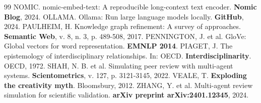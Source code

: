 \documentclass[a4paper,12pt]{article}
\begin{document}
\begin{thebibliography}{99}
 NOMIC. nomic-embed-text: A reproducible long-context text encoder. \textbf{Nomic Blog}, 2024.
 OLLAMA. Ollama: Run large language models locally. \textbf{GitHub}, 2024.
 PAULHEIM, H. Knowledge graph refinement: A survey of approaches. \textbf{Semantic Web}, v. 8, n. 3, p. 489-508, 2017.
 PENNINGTON, J. et al. GloVe: Global vectors for word representation. \textbf{EMNLP 2014}.
 PIAGET, J. The epistemology of interdisciplinary relationships. In: OECD. \textbf{Interdisciplinarity}. OECD, 1972.
 SHAH, N. B. et al. Simulating peer review with multi-agent systems. \textbf{Scientometrics}, v. 127, p. 3121-3145, 2022.
 VEALE, T. \textbf{Exploding the creativity myth}. Bloomsbury, 2012.
 ZHANG, Y. et al. Multi-agent review simulation for scientific validation. \textbf{arXiv preprint arXiv:2401.12345}, 2024.

\end{thebibliography}
\end{document}
